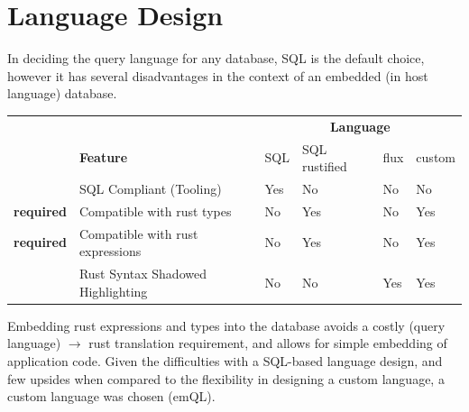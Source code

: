 \section{Language Design}
In deciding the query language for any database, SQL is the default choice, however it has several disadvantages in the context of an embedded (in host language) database.
\begin{center}
    \begin{tabular}{l l | l l l l}
                          &                                   & \multicolumn{4}{c}{\textbf{Language}}                                 \\
                          & \textbf{Feature}                  & SQL                                   & SQL rustified & flux & custom \\
        \hline
                          & SQL Compliant (Tooling)           & Yes                                   & No            & No   & No     \\
        \textbf{required} & Compatible with rust types        & No                                    & Yes           & No   & Yes    \\
        \textbf{required} & Compatible with rust expressions  & No                                    & Yes           & No   & Yes    \\
                          & Rust Syntax Shadowed Highlighting & No                                    & No            & Yes  & Yes    \\
    \end{tabular}
\end{center}
\noindent
Embedding rust expressions and types into the database avoids a costly (query language) $\to$ rust translation
requirement, and allows for simple embedding of application code. Given the difficulties with a SQL-based language design, and 
few upsides when compared to the flexibility in designing a custom language, a custom language was chosen (emQL).

